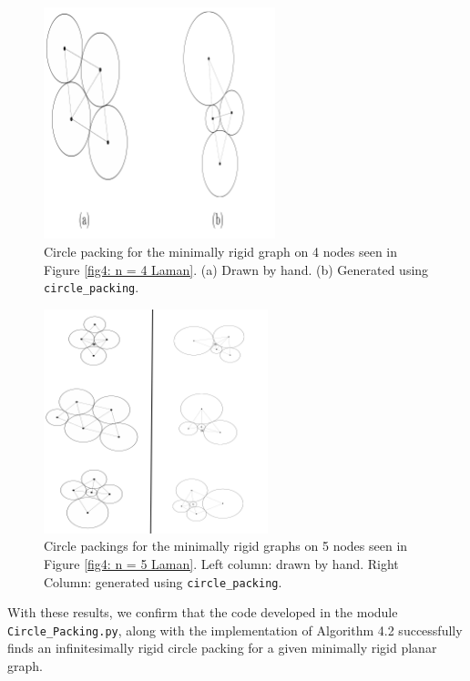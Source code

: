 \begin{figure}[htbp]
    \centering      
    \includegraphics[width = 0.6\textwidth]{Chapter 4/12. 4 circle.png} \hspace{1 cm}
    \caption{Circle packing for the minimally rigid graph on 4 nodes seen in Figure \ref{fig4: n = 4 Laman}. (a) Drawn by hand. (b) Generated using \texttt{circle\_packing}.} 
    \label{fig4: 4 node packing}
\end{figure}

\begin{figure}[htbp]
    \centering
    \includegraphics[width = 0.58\textwidth]{Chapter 4/13. 5 circle.png}
    \caption{Circle packings for the minimally rigid graphs on 5 nodes seen in Figure \ref{fig4: n = 5 Laman}. Left column: drawn by hand. Right Column: generated using \texttt{circle\_packing}.}
    \label{fig4: 5 node packing}
\end{figure}
\vspace{-3mm}
\begin{flushleft}
With these results, we confirm that the code developed in the module \texttt{Circle\_Packing.py}, along with the implementation of Algorithm 4.2 successfully finds an infinitesimally rigid circle packing for a given minimally rigid planar graph.
\end{flushleft}

